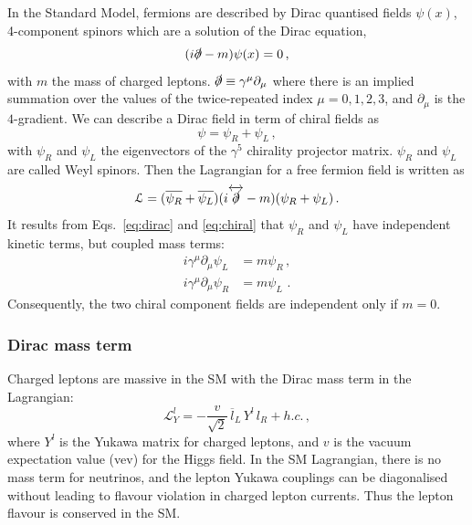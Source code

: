 In the Standard Model, fermions are described by Dirac quantised fields $\psi(x)$, 4-component spinors which are a solution of the Dirac equation,
\begin{equation}
  (i\slashed\partial-m)\psi(x)=0\,,
  \label{eq:dirac}
\end{equation}
with $m$ the mass of charged leptons.
$\slashed\partial\equiv \gamma^{\mu}\partial_{\mu}$ where there is an implied summation over the values of the twice-repeated index $\mu=0,1,2,3$, and $\partial_{\mu}$ is the $4$-gradient.
We can describe a Dirac field in term of chiral fields as
\begin{equation}
  \psi = \psi_R + \psi_L\,,
  \label{eq:chiral}
\end{equation}
with $\psi_R$ and $\psi_L$ the eigenvectors of the $\gamma^{5}$ chirality projector matrix.
$\psi_R$ and $\psi_L$ are called Weyl spinors.
Then the Lagrangian for a free fermion field is written as
\begin{equation}
\mathcal{L} = (\overline{\psi_R} + \overline{\psi_L})(i\overleftrightarrow{\slashed{\partial}}-m)(\psi_R + \psi_L)\,.
\end{equation}
It results from Eqs.~\eqref{eq:dirac} and \eqref{eq:chiral} that $\psi_R$ and $\psi_L$ have independent kinetic terms, but coupled mass terms:
\begin{align}
i\gamma^{\mu}\partial_{\mu}\psi_L& = m\psi_R\,,\label{eq:psi_L}\\
i\gamma^{\mu}\partial_{\mu}\psi_R& = m\psi_L\,\label{eq:psi_R}\,.
\end{align}
Consequently, the two chiral component fields are independent only if $m = 0$.

\subsubsection*{Dirac mass term}

Charged leptons are massive in the SM with the Dirac mass term in the Lagrangian:
\begin{equation}
\mathcal{L}^{l}_{Y} = -\frac{v}{\sqrt{2}}\,\overline{l}_{L}\,Y^{l}\,l_{R} + h.c.\,,
\end{equation}
where $Y^{l}$ is the Yukawa matrix for charged leptons, and $v$ is the vacuum expectation value (vev) for the Higgs field.
In the SM Lagrangian, there is no mass term for neutrinos, and the lepton Yukawa couplings can be diagonalised without leading to flavour violation in charged lepton currents.
Thus the lepton flavour is conserved in the SM.

